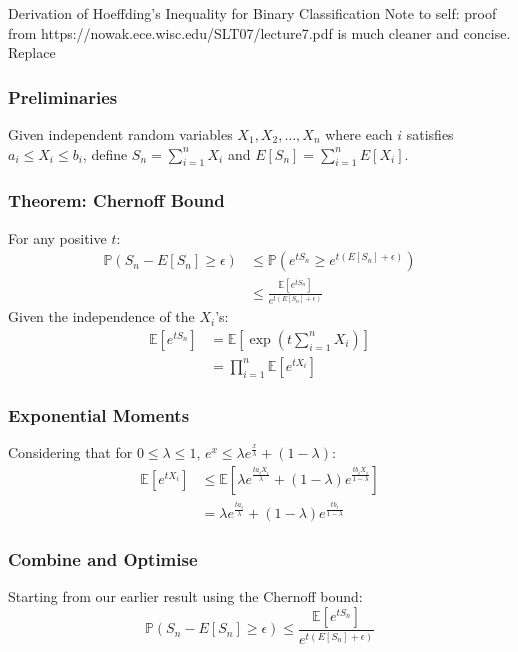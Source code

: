 \begin{sidenotebox}{Derivation of Hoeffding's Inequality for Binary Classification}
Note to self: proof from https://nowak.ece.wisc.edu/SLT07/lecture7.pdf is much cleaner and concise. Replace

\subsubsection{Preliminaries}
Given independent random variables \(X_1, X_2, \ldots, X_n\) where each \(i\) satisfies \(a_i \leq X_i \leq b_i\), define \(S_n = \sum_{i=1}^{n} X_i\) and \(E[S_n] = \sum_{i=1}^{n} E[X_i]\).

\subsubsection{Theorem: Chernoff Bound}
For any positive \(t\):
\begin{align*}
\mathbb{P}(S_n - E[S_n] \geq \epsilon) &\leq \mathbb{P}(e^{tS_n} \geq e^{t(E[S_n] + \epsilon)}) \\
&\leq \frac{\mathbb{E}[e^{tS_n}]}{e^{t(E[S_n] + \epsilon)}}
\end{align*}
Given the independence of the \(X_i\)'s:
\begin{align*}
\mathbb{E}[e^{tS_n}] &= \mathbb{E}\left[\exp\left(t\sum_{i=1}^{n} X_i\right)\right] \\
&= \prod_{i=1}^{n} \mathbb{E}[e^{tX_i}]
\end{align*}

\subsubsection{Exponential Moments}
Considering that for \(0 \leq \lambda \leq 1\), \(e^x \leq \lambda e^{\frac{x}{\lambda}} + (1-\lambda)\):
\begin{align*}
\mathbb{E}[e^{tX_i}] &\leq \mathbb{E}\left[\lambda e^{\frac{ta_iX_i}{\lambda}} + (1-\lambda)e^{\frac{tb_iX_i}{1-\lambda}}\right] \\
&= \lambda e^{\frac{ta_i}{\lambda}} + (1-\lambda)e^{\frac{tb_i}{1-\lambda}}
\end{align*}

\subsubsection{Combine and Optimise}
Starting from our earlier result using the Chernoff bound:
\[ \mathbb{P}(S_n - E[S_n] \geq \epsilon) \leq \frac{\mathbb{E}[e^{tS_n}]}{e^{t(E[S_n] + \epsilon)}} \]


\end{sidenotebox}

